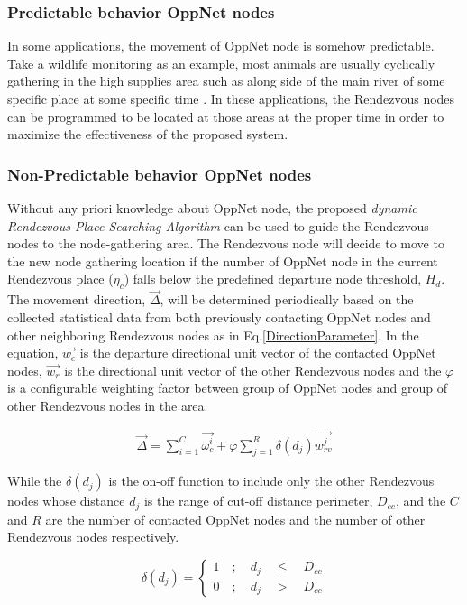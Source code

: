\documentclass[conference]{IEEEtran}
\begin{document}
\subsubsection{Predictable behavior OppNet nodes}
In some applications, the movement of OppNet node is somehow predictable.
Take a wildlife monitoring as an example, most animals are usually cyclically gathering in the high supplies area such as along side of the main river of some specific place at some specific time \cite{Yu2007}.
In these applications, the Rendezvous nodes can be programmed to be located at those areas at the proper time in order to maximize the effectiveness of the proposed system.

\subsubsection{Non-Predictable behavior OppNet nodes}
Without any priori knowledge about OppNet node, the proposed \emph{dynamic Rendezvous Place Searching Algorithm} can be used to guide the Rendezvous nodes to the node-gathering area.
The Rendezvous node will decide to move to the new node gathering location if the number of OppNet node in the current Rendezvous place ($\eta_{c}$) falls below the predefined departure node threshold, $H_{d}$.
The movement direction, $\vec{\Delta}$, will be determined periodically based on the collected statistical data from both previously contacting OppNet nodes and other neighboring Rendezvous nodes as in Eq.\ref{DirectionParameter}.
In the equation, $\vec{w_c}$ is the departure directional unit vector of the contacted OppNet nodes, $\vec{w_r}$ is the directional unit vector of the other Rendezvous nodes and the $\varphi$ is a configurable weighting factor between group of OppNet nodes and group of other Rendezvous nodes in the area.

\begin{eqnarray}
\label{DirectionParameter}
\vec{\Delta} =\sum _{ i=1 }^{ C }{ \vec { { \omega }_{ c }^{ i } }  } + \varphi \sum _{ j=1 }^{ R }{ \delta\left( d_{j} \right)
	\vec { {w }_{ rv }^{ j } }  }
\end{eqnarray}

While the $\delta\left( d_{j} \right)$ is the on-off function to include only the other Rendezvous nodes whose distance $d_j$ is the range of cut-off distance perimeter, $D_{cc}$, and the  $C$ and $R$ are the number of contacted OppNet nodes and the number of other Rendezvous nodes respectively.

\[\delta \left( { d }_{ j } \right) =\begin{cases} 1\quad ;\quad { d }_{ j }\quad \le { \quad D }_{ cc } \\ 0\quad ;\quad { d }_{ j }\quad >{ \quad D }_{ cc } \end{cases}  \] 
\end{document}
